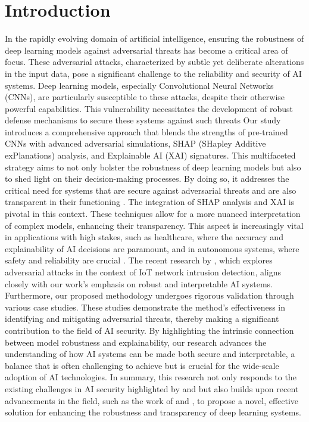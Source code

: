 \documentclass[10pt, conference, a4paper, final]{IEEEtran}
\begin{document}
\section{Introduction}
In the rapidly evolving domain of artificial intelligence, ensuring the robustness of deep learning models against adversarial 
threats has become a critical area of focus. These adversarial attacks, characterized by subtle yet deliberate alterations in the 
input data, pose a significant challenge to the reliability and security of AI systems. Deep learning models, especially Convolutional
 Neural Networks (CNNs), are particularly susceptible to these attacks, despite their otherwise powerful capabilities. This vulnerability
necessitates the development of robust defense mechanisms to secure these systems against such threats 
\cite {Akhtar, McInnes}
Our study introduces a comprehensive approach that blends the strengths of pre-trained CNNs with advanced adversarial simulations, 
SHAP (SHapley Additive exPlanations) analysis, and Explainable AI (XAI) signatures. This multifaceted strategy aims to not only bolster
 the robustness of deep learning models but also to shed light on their decision-making processes. By doing so, it addresses the critical
  need for systems that are secure against adversarial threats and are also transparent in their functioning  \cite {Lee, Morris, Croce}.
The integration of SHAP analysis and XAI is pivotal in this context. These techniques allow for a more nuanced interpretation of complex models, 
enhancing their transparency. This aspect is increasingly vital in applications with high stakes, such as healthcare, where the accuracy and 
explainability of AI decisions are paramount, and in autonomous systems, where safety and reliability are crucial \cite {Zhou}. 
The recent research by \cite {Zhou}, which explores adversarial attacks in the context of IoT network intrusion detection, aligns closely with our work's emphasis on robust and interpretable AI systems.
Furthermore, our proposed methodology undergoes rigorous validation through various case studies. These studies demonstrate the method's effectiveness in 
identifying and mitigating adversarial threats, thereby making a significant contribution to the field of AI security. By highlighting the intrinsic
 connection between model robustness and explainability, our research advances the understanding of how AI systems can be made both secure and interpretable, 
 a balance that is often challenging to achieve but is crucial for the wide-scale adoption of AI technologies.
In summary, this research not only responds to the existing challenges in AI security highlighted by \cite {Akhtar} and \cite {Dong}  but also builds 
upon recent advancements in the field, such as the work of \cite {Morris} and \cite {Croce}, to propose a novel, effective solution for enhancing the robustness and transparency of deep learning systems.
\end{document}
